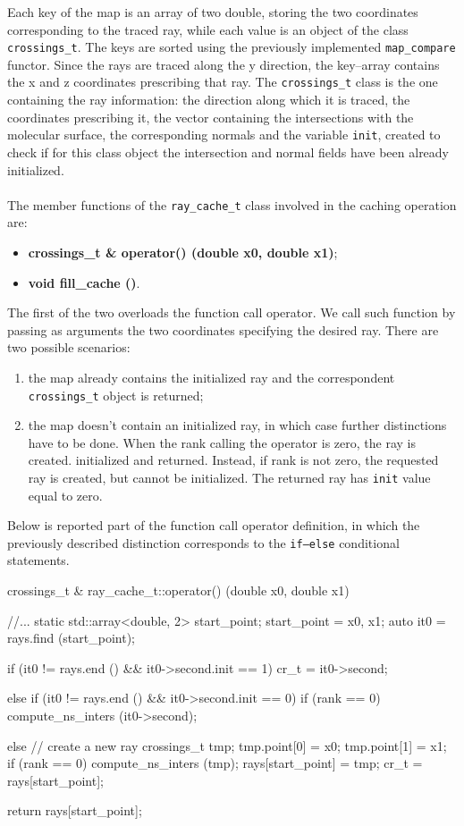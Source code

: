 \documentclass[11pt,a4paper]{article}
\begin{document}
Each key of the map is an array of two double, storing the two coordinates corresponding to the traced ray, while each value is an object of the class \texttt{crossings\_t}. The keys are sorted using the previously implemented \texttt{map\_compare} functor. Since the rays are traced along the y direction, the key--array contains the x and z coordinates prescribing that ray. The \texttt{crossings\_t} class is the one containing the ray information: the direction along which it is traced, the coordinates prescribing it, the vector containing the intersections with the molecular surface, the corresponding normals and the variable \texttt{init}, created to check if for this class object the intersection and normal fields have been already initialized. \\\\
The member functions of the \texttt{ray\_cache\_t} class involved in the caching operation are: 
\begin{itemize}
    \item \textbf{crossings\_t \&
   operator() (double x0, double x1)};
   \item \textbf{void 
   fill\_cache ()}.
\end{itemize}
\bigskip
The first of the two overloads the function call operator. We call such function by passing as arguments the two coordinates specifying the desired ray. There are two possible scenarios: 
\begin{enumerate}
    \item the map already contains the initialized ray and the correspondent \texttt{crossings\_t} object is returned;
    \item the map doesn't contain an initialized ray, in which case further distinctions have to be done. When the rank calling the operator is zero, the ray is created. initialized and returned. Instead, if rank is not zero, the requested ray is created, but cannot be initialized. The returned ray has \texttt{init} value equal to zero.
\end{enumerate}
\bigskip
Below is reported part of the function call operator definition, in which the previously described distinction corresponds to the \texttt{if--else} conditional statements. 

\begin{code}
crossings_t &
ray_cache_t::operator() (double x0, double x1) 
{
  
  //...
  static std::array<double, 2> start_point;
  start_point = {x0, x1};
  auto it0 = rays.find (start_point);
   
  if (it0 != rays.end () && it0->second.init == 1)
    cr_t = it0->second;
   
  else if (it0 != rays.end () && it0->second.init == 0)
    if (rank == 0)
      compute_ns_inters (it0->second);

  else
    {
      // create a new ray
      crossings_t tmp;
      tmp.point[0] = x0;
      tmp.point[1] = x1;
      if (rank == 0)
          compute_ns_inters (tmp);
      rays[start_point] = tmp;
      cr_t = rays[start_point];
    }
    
  return rays[start_point];
}
\end{code}
\end{document}
